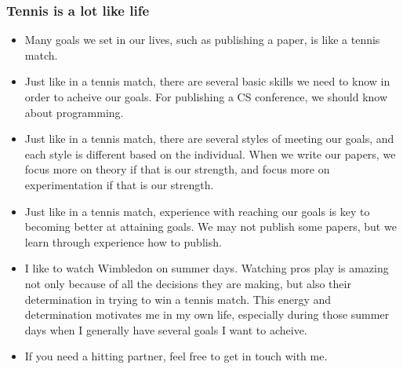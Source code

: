\begin{frame} 
\frametitle{Tennis is a lot like life} 
\begin{itemize}  
\item \small Many goals we set in our lives, such as publishing a
  paper, is like a tennis match. \\ 
\item \small Just like in a tennis match, there are several basic skills we need to know in order
  to acheive our goals.  For publishing a CS conference, we should know about
  programming. 

\item \small Just like in a tennis match, there are several styles of
  meeting our goals, and each style is different based on the
  individual.  When we write our papers, we focus more on theory if
  that is our strength, and focus more on experimentation if that is
  our strength.  
 
\item \small Just like in a tennis match, experience with reaching our
  goals is key to becoming better at attaining goals. 
  We may not publish some papers, but we learn through experience how
  to publish. 

\item \small I like to watch Wimbledon on summer days. 
Watching pros play is amazing not only because of all the decisions they are 
making, but also their determination in trying to win a tennis match. 
This energy and determination motivates me in my own life, especially
during those summer days when I generally have several goals I want to
acheive. \\ 

\item \small If you need a hitting partner, feel free to get in touch
  with me. \\
  



\end{itemize}
\end{frame}
